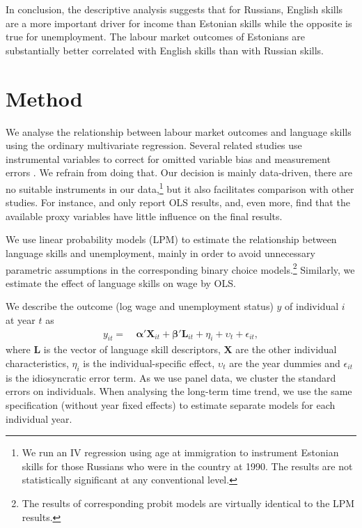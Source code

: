 \documentclass[12pt, a4paper]{article}
\renewcommand*{\vec}[1]{\boldsymbol{#1}}
\begin{document}
In conclusion, the descriptive analysis suggests that for Russians,
English skills are a more important driver for income than Estonian
skills while the opposite is true for unemployment. The labour market
outcomes of Estonians are substantially better correlated with English
skills than with Russian skills.



\section{Method}
\label{sec:method}

We analyse the relationship between labour market outcomes and language
skills using the ordinary multivariate regression.
Several related studies use instrumental variables to correct for
omitted variable bias and measurement errors \citep{Chiswick1995, bleakley+chin2004}.
We refrain from doing that. Our decision is mainly data-driven,
there are no suitable instruments in our data,\footnote{We run an IV
	regression using age at immigration to instrument Estonian skills
	for those Russians who were in the country at 1990. The results are
	not statistically significant at any conventional level.} but it also facilitates
comparison with other studies. For instance,
\citet{azam+2013EDandCC} and \citet{paolo+tansel2015JofDevStud} only
report OLS results, and, even more, find that the available proxy
variables have little influence on the final results.

We use linear probability models (LPM) to estimate the relationship between
language skills and unemployment, mainly in order to avoid unnecessary parametric
assumptions in the corresponding binary choice models.\footnote{The
	results of corresponding probit models are virtually identical to the LPM results.}
Similarly, we estimate the effect of language skills on wage by
OLS. 

We describe the outcome (log wage and unemployment status) $y$ of individual $i$ at year $t$ as
\begin{equation}
	\label{eq:specification}
	\begin{split}                            
		y_{it} = &\: \vec{\alpha}' \vec{X}_{it} + \vec{\beta}{}' \vec{L}_{it} +
		\eta_{i} +
		\upsilon_{t} + \epsilon_{it},                                                                             
	\end{split}
\end{equation}
where $\vec{L}$ is the vector of
language skill descriptors, $\vec{X}$ are the other individual
characteristics, $\eta_{i}$ is the individual-specific effect, $\upsilon_{t}$ are the year dummies and $\epsilon_{it}$
is the idiosyncratic error term. 
As we use panel data, we cluster the
standard errors on individuals. When analysing the long-term time
trend, we use the same specification (without year fixed effects) to
estimate separate models for each individual year.
\end{document}
